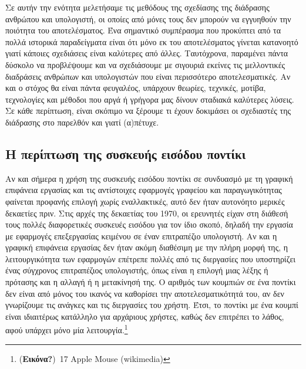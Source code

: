 \documentclass[
]{article}
\begin{document}
Σε αυτήν την ενότητα μελετήσαμε τις μεθόδους της σχεδίασης της διάδρασης
ανθρώπου και υπολογιστή, οι οποίες από μόνες τους δεν μπορούν να
εγγυηθούν την ποιότητα του αποτελέσματος. Ένα σημαντικό συμπέρασμα που
προκύπτει από τα πολλά ιστορικά παραδείγματα είναι ότι μόνο εκ του
αποτελέσματος γίνεται κατανοητό γιατί κάποιες σχεδιάσεις είναι καλύτερες
από άλλες. Ταυτόχρονα, παραμένει πάντα δύσκολο να προβλέψουμε και να
σχεδιάσουμε με σιγουριά εκείνες τις μελλοντικές διαδράσεις ανθρώπων και
υπολογιστών που είναι περισσότερο αποτελεσματικές. Αν και ο στόχος θα
είναι πάντα φευγαλέος, υπάρχουν θεωρίες, τεχνικές, μοτίβα, τεχνολογίες
και μέθοδοι που αργά ή γρήγορα μας δίνουν σταδιακά καλύτερες λύσεις. Σε
κάθε περίπτωση, είναι σκόπιμο να ξέρουμε τι έχουν δοκιμάσει οι
σχεδιαστές της διάδρασης στο παρελθόν και γιατί (α)πέτυχε.

\hypertarget{ux3b7-ux3c0ux3b5ux3c1ux3afux3c0ux3c4ux3c9ux3c3ux3b7-ux3c4ux3b7ux3c2-ux3c3ux3c5ux3c3ux3baux3b5ux3c5ux3aeux3c2-ux3b5ux3b9ux3c3ux3ccux3b4ux3bfux3c5-ux3c0ux3bfux3bdux3c4ux3afux3baux3b9}{%
\subsection{Η περίπτωση της συσκευής εισόδου
ποντίκι}\label{ux3b7-ux3c0ux3b5ux3c1ux3afux3c0ux3c4ux3c9ux3c3ux3b7-ux3c4ux3b7ux3c2-ux3c3ux3c5ux3c3ux3baux3b5ux3c5ux3aeux3c2-ux3b5ux3b9ux3c3ux3ccux3b4ux3bfux3c5-ux3c0ux3bfux3bdux3c4ux3afux3baux3b9}}

Αν και σήμερα η χρήση της συσκευής εισόδου ποντίκι σε συνδυασμό με τη
γραφική επιφάνεια εργασίας και τις αντίστοιχες εφαρμογές γραφείου και
παραγωγικότητας φαίνεται προφανής επιλογή χωρίς εναλλακτικές, αυτό δεν
ήταν αυτονόητο μερικές δεκαετίες πριν. Στις αρχές της δεκαετίας του
1970, οι ερευνητές είχαν στη διάθεσή τους πολλές διαφορετικές συσκευές
εισόδου για τον ίδιο σκοπό, δηλαδή την εργασία με εφαρμογές επεξεργασίας
κειμένου σε έναν επιτραπέζιο υπολογιστή. Αν και η γραφική επιφάνεια
εργασίας δεν ήταν ακόμη διαθέσιμη με την πλήρη μορφή της, η
λειτουργικότητα των εφαρμογών επέτρεπε πολλές από τις διεργασίες που
υποστηρίζει ένας σύγχρονος επιτραπέζιος υπολογιστής, όπως είναι η
επιλογή μιας λέξης ή πρότασης και η αλλαγή ή η μετακίνησή της. Ο αριθμός
των κουμπιών σε ένα ποντίκι δεν είναι από μόνος του ικανός να καθορίσει
την αποτελεσματικότητά του, αν δεν γνωρίζουμε τις ανάγκες και τις
διεργασίες του χρήστη. Έτσι, το ποντίκι με ένα κουμπί είναι ιδιαιτέρως
κατάλληλο για αρχάριους χρήστες, καθώς δεν επιτρέπει το λάθος, αφού
υπάρχει μόνο μία λειτουργία.\footnote{(\textbf{Εικόνα?})~17 Apple Mouse
  (wikimedia)}
\end{document}
